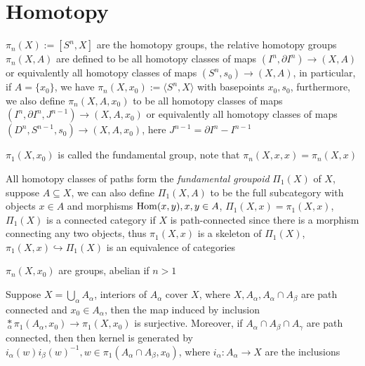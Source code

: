 \documentclass[main]{subfiles}
\begin{document}
\tableofcontents
\newpage

\section{Homotopy}

\begin{definition}
$\pi_n(X):=[S^n,X]$ are the homotopy groups, the relative homotopy groups $\pi_n(X,A)$ are defined to be all homotopy classes of maps $(I^n,\partial I^n)\to(X,A)$ or equivalently all homotopy classes of maps $(S^n,s_0)\to(X,A)$, in particular, if $A=\{x_0\}$, we have $\pi_n(X,x_0):=\langle S^n,X\rangle$ with basepoints $x_0,s_0$, furthermore, we also define $\pi_n(X,A,x_0)$ to be all homotopy classes of maps $(I^n,\partial I^n,J^{n-1})\to(X,A,x_0)$ or equivalently all homotopy classes of maps $(D^n,S^{n-1},s_0)\to(X,A,x_0)$, here $J^{n-1}=\partial I^n-I^{n-1}$ \par
$\pi_1(X,x_0)$ is called the fundamental group, note that $\pi_n(X,x,x)=\pi_n(X,x)$
\end{definition}

\begin{definition}
All homotopy classes of paths form the \textit{fundamental groupoid} $\Pi_1(X)$ of $X$, suppose $A\subseteq X$, we can also define $\Pi_1(X,A)$ to be the full subcategory with objects $x\in A$ and morphisms $\operatorname{Hom}(x,y),x,y\in A$, $\Pi_1(X,x)=\pi_1(X,x)$, $\Pi_1(X)$ is a connected category if $X$ is path-connected since there is a morphism connecting any two objects, thus $\pi_1(X,x)$ is a skeleton of $\Pi_1(X)$, $\pi_1(X,x)\hookrightarrow\Pi_1(X)$ is an equivalence of categories
\end{definition}

\begin{proposition}
$\pi_n(X,x_0)$ are groups, abelian if $n>1$
\end{proposition}

\begin{theorem}\label{Van Kampen's theorem}
Suppose $X=\displaystyle\bigcup_{\alpha}A_\alpha$, interiors of $A_\alpha$ cover $X$, where $X,A_\alpha,A_\alpha\cap A_\beta$ are path connected and $x_0\in A_\alpha$, then the map induced by inclusion $\underset{\alpha}{*}\pi_1(A_\alpha,x_0)\to\pi_1(X,x_0)$ is surjective. Moreover, if $A_\alpha\cap A_\beta\cap A_\gamma$ are path connected, then then kernel is generated by $i_\alpha(w)i_\beta(w)^{-1},w\in\pi_1(A_\alpha\cap A_\beta,x_0)$, where $i_\alpha:A_\alpha\to X$ are the inclusions
\end{theorem}
\end{document}
